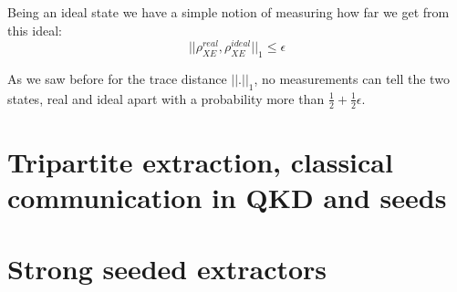 Being an ideal state we have a simple notion of measuring how far we get from this ideal:
\begin{equation}
	||\rho^{real}_{XE}, \rho^{ideal}_{XE}||_1 \le \epsilon
\end{equation}

As we saw before for the trace distance $||.||_1$, no measurements can tell the two states, real and ideal apart with a probability more than $\frac{1}{2} +\frac{1}{2}\epsilon$.



\section{Tripartite extraction, classical communication in QKD and seeds}

\section{Strong seeded extractors}
